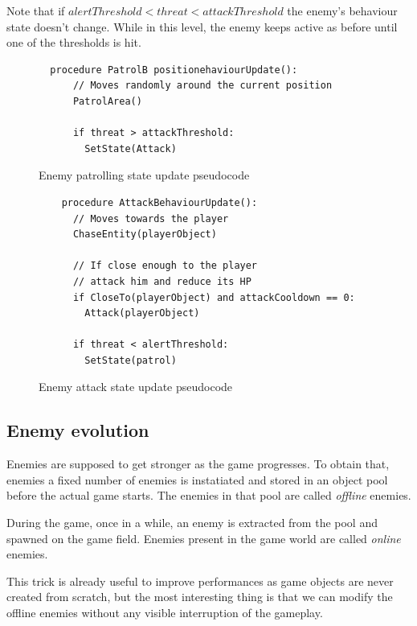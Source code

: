 \documentclass[11pt]{article}
\begin{document}
Note that if $alertThreshold < threat < attackThreshold$ the enemy's behaviour state doesn't change. While in this level, the enemy keeps active as before until one of the thresholds is hit.

\FloatBarrier

\begin{figure}
  \begin{lstlisting}
  procedure PatrolB positionehaviourUpdate():
      // Moves randomly around the current position
      PatrolArea() 

      if threat > attackThreshold:
        SetState(Attack)
  \end{lstlisting}
  \caption{Enemy patrolling state update pseudocode}
\end{figure}

\begin{figure}
  \begin{lstlisting}
    procedure AttackBehaviourUpdate():
      // Moves towards the player
      ChaseEntity(playerObject) 

      // If close enough to the player
      // attack him and reduce its HP
      if CloseTo(playerObject) and attackCooldown == 0: 
        Attack(playerObject)

      if threat < alertThreshold: 
        SetState(patrol)
  \end{lstlisting}
  \caption{Enemy attack state update pseudocode}
\end{figure}

\FloatBarrier

\subsection{Enemy evolution}
Enemies are supposed to get stronger as the game progresses.
To obtain that, enemies a fixed number of enemies is instatiated and stored in an object pool before the actual game starts. The enemies in that pool are called \textit{offline} enemies.

During the game, once in a while, an enemy is extracted from the pool and spawned on the game field. Enemies present in the game world are called \textit{online} enemies.

This trick is already useful to improve performances as game objects are never created from scratch, but the most interesting thing is that we can modify the offline enemies without any visible interruption of the gameplay.
\end{document}
